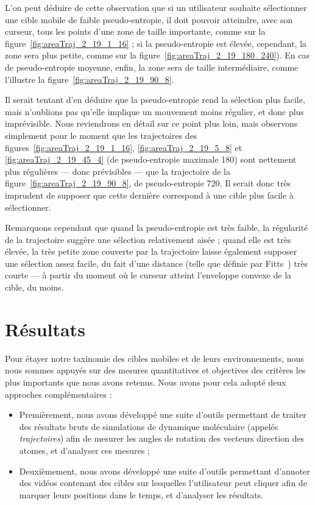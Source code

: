 	L'on peut déduire de cette observation que si un utilisateur souhaite sélectionner une cible mobile de faible pseudo-entropie, il doit pouvoir atteindre, avec son curseur, tous les points d'une zone de taille importante, comme sur la figure~\ref{fig:areaTraj_2_19_1_16} ; si la pseudo-entropie est élevée, cependant, la zone sera plus petite, comme sur la figure~\ref{fig:areaTraj_2_19_180_240}). En cas de pseudo-entropie moyenne, enfin, la zone sera de taille intermédiaire, comme l'illustre la figure~\ref{fig:areaTraj_2_19_90_8}.
	
	Il serait tentant d'en déduire que la pseudo-entropie rend la sélection plus facile, mais n'oublions pas qu'elle implique un mouvement moins régulier, et donc plus imprévisible. Nous reviendrons en détail sur ce point plus loin, mais observons simplement pour le moment que les trajectoires des figures~\ref{fig:areaTraj_2_19_1_16}, \ref{fig:areaTraj_2_19_5_8} et \ref{fig:areaTraj_2_19_45_4} (de pseudo-entropie maximale 180) sont nettement plus régulières --- donc prévisibles --- que la trajectoire de la figure~\ref{fig:areaTraj_2_19_90_8}, de pseudo-entropie 720. Il serait donc très imprudent de supposer que cette dernière correspond à une cible plus facile à sélectionner.
	
	Remarquons cependant que quand la pseudo-entropie est très faible, la régularité de la trajectoire suggère une sélection relativement aisée ; quand elle est très élevée, la très petite zone couverte par la trajectoire laisse également supposer une sélection assez facile, du fait d'une distance (telle que définie par Fitts~\cite{fitts1954information}) très courte --- à partir du moment où le curseur atteint l'enveloppe convexe de la cible, du moins.
	
\section{Résultats}
	Pour étayer notre taxinomie des cibles mobiles et de leurs environnements, nous nous sommes appuyés sur des mesures quantitatives et objectives des critères les plus importants que nous avons retenus. Nous avons pour cela adopté deux approches complémentaires :
	
	\begin{itemize}
		\item Premièrement, nous avons développé une suite d'outils permettant de traiter des résultats bruts de simulations de dynamique moléculaire (appelés \emph{trajectoires}) afin de mesurer les angles de rotation des vecteurs direction des atomes, et d'analyser ces mesures ;
		\item Deuxièmement, nous avons développé une suite d'outils permettant d'annoter des vidéos contenant des cibles sur lesquelles l'utilisateur peut cliquer afin de marquer leurs positions dans le temps, et d'analyser les résultats.
	\end{itemize}


